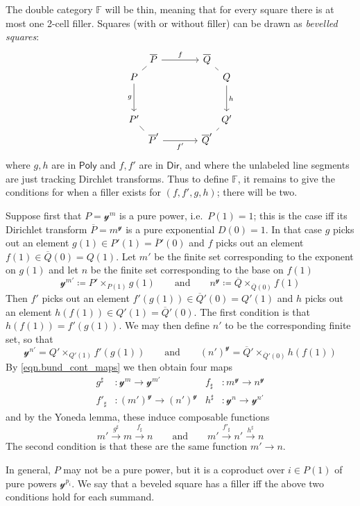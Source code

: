\documentclass[11pt, article, one side]{memoir}
\theoremstyle{theorem}
\theoremstyle{definition}
\theoremstyle{remark}
\newcommand{\Cat}[1]{\mathsf{#1}}%
\newcommand{\To}[1]{\xrightarrow{#1}}
\newcommand{\ol}[1]{\overline{#1}}
\newcommand{\yon}{\mathcal{y}}
\newcommand{\poly}{\Cat{Poly}}
\newcommand{\dir}{\Cat{Dir}}
\newcommand{\ff}{\mathbb{F}}
\newcommand{\qqand}{\qquad\text{and}\qquad}
\begin{document}
The double category $\ff$ will be thin, meaning that for every square there is at most one 2-cell filler. Squares (with or without filler) can be drawn as \emph{bevelled squares}:
\[
\begin{tikzcd}[sep=large]
&[-35pt]
\overline{P}\ar[r, "f"]&
\overline{Q}\\[-25pt]
P\ar[d, "g"']\arrow[ur, no head]&&&[-35pt]\ar[ul, no head]\ar[d, "h"]
Q\\
P'\ar[dr, no head]&&&
Q'\ar[dl, no head]\\[-25pt]&
\overline{P}'\ar[r, "f'"']&
\overline{Q}'
\end{tikzcd}
\]
where $g,h$ are in $\poly$ and $f,f'$ are in $\dir$, and where the unlabeled line segments are just tracking Dirchlet transforms. Thus to define $\ff$, it remains to give the conditions for when a filler exists for $(f,f',g,h)$; there will be two.

Suppose first that $P=\yon^m$ is a pure power, i.e.\ $P(1)=1$; this is the case iff its Dirichlet transform $\overline{P}=m^\yon$ is a pure exponential $D(0)=1$. In that case $g$ picks out an element $g(1)\in P'(1)=\ol{P}'(0)$ and $f$ picks out an element $f(1)\in \ol{Q}(0)=Q(1)$. Let $m'$ be the finite set corresponding to the exponent on $g(1)$ and let $n$ be the finite set corresponding to the base on $f(1)$
\[
  \yon^{m'}\coloneqq P'\times_{P(1)}g(1)
  \qqand
  n^\yon\coloneqq\ol{Q}\times_{\ol{Q}(0)}f(1)
\]
Then $f'$ picks out an element $f'(g(1))\in\ol{Q}'(0)=Q'(1)$ and $h$ picks out an element $h(f(1))\in Q'(1)=\ol{Q}'(0)$. The first condition is that $h(f(1))=f'(g(1))$. We may then define $n'$ to be the corresponding finite set, so that
\[
  \yon^{n'}= Q'\times_{Q'(1)}f'(g(1))
  \qqand
  (n')^\yon=\ol{Q}'\times_{\ol{Q}'(0)}h(f(1))
\]
By \cref{eqn.bund_cont_maps} we then obtain four maps
\begin{align*}
	g^\sharp&\colon\yon^m\to\yon^{m'}&
	f_\sharp&\colon m^\yon\to n^\yon\\
	f'_\sharp&\colon(m')^\yon\to(n')^\yon&
	h^\sharp&\colon\yon^{n}\to\yon^{n'}
\end{align*}
and by the Yoneda lemma, these induce composable functions
\[
  m'\To{g^\sharp} m\To{f_\sharp} n
  \qqand
  m'\To{f'_\sharp} n'\To{h^\sharp} n
\]
The second condition is that these are the same function $m'\to n$. 

In general, $P$ may not be a pure power, but it is a coproduct over $i\in P(1)$ of pure powers $\yon^{p_i}$. We say that a beveled square has a filler iff the above two conditions hold for each summand.
\end{document}
